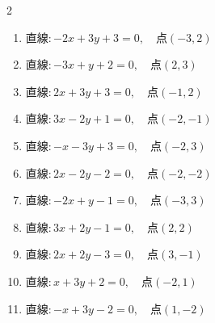 \begin{multicols}{2}
\begin{enumerate}
  \item $直線:-2x+3y+3=0,\quad 点 ( -3, 2 )$


  \item $直線:-3x+y+2=0,\quad 点 ( 2, 3 )$


  \item $直線:2x+3y+3=0,\quad 点 ( -1, 2 )$


  \item $直線:3x-2y+1=0,\quad 点 ( -2, -1 )$


\columnbreak %

\resetques

  \item $直線:-x-3y+3=0,\quad 点 ( -2, 3 )$


  \item $直線:2x-2y-2=0,\quad 点 ( -2, -2 )$


  \item $直線:-2x+y-1=0,\quad 点 ( -3, 3 )$


  \item $直線:3x+2y-1=0,\quad 点 ( 2, 2 )$


  \item $直線:2x+2y-3=0,\quad 点 ( 3, -1 )$


  \item $直線:x+3y+2=0,\quad 点 ( -2, 1 )$


  \item $直線:-x+3y-2=0,\quad 点 ( 1, -2 )$



\end{enumerate}
\end{multicols}
